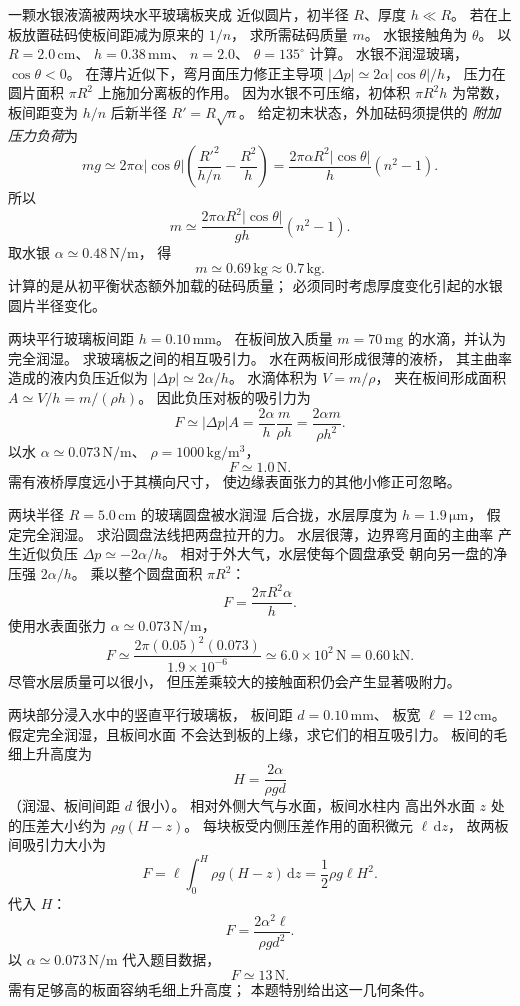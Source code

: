 一颗水银液滴被两块水平玻璃板夹成
近似圆片，初半径 $R$、厚度 $h\ll R$。
若在上板放置砝码使板间距减为原来的 $1/n$，
求所需砝码质量 $m$。
水银接触角为 $\theta$。
以 $R=2.0\,\mathrm{cm}$、
$h=0.38\,\mathrm{mm}$、
$n=2.0$、
$\theta=135^\circ$ 计算。
\exsolution
水银不润湿玻璃，
$\cos\theta<0$。
在薄片近似下，弯月面压力修正主导项
$|\Delta p|\simeq2\alpha|\cos\theta|/h$，
压力在圆片面积 $\pi R^2$ 上施加分离板的作用。
因为水银不可压缩，初体积
$\pi R^2h$ 为常数，
板间距变为 $h/n$ 后新半径
$R'=R\sqrt n$。
给定初末状态，外加砝码须提供的
\emph{附加压力负荷}为
\[
mg\simeq 2\pi\alpha|\cos\theta|
\left(\frac{R'^2}{h/n}-\frac{R^2}{h}\right)
=\frac{2\pi\alpha R^2|\cos\theta|}{h}(n^2-1).
\]
所以
\[
\boxed{m\simeq
\frac{2\pi\alpha R^2|\cos\theta|}{gh}(n^2-1)}.
\]
取水银 $\alpha\simeq0.48\,\mathrm{N/m}$，
得
\[
\boxed{m\simeq0.69\,\mathrm{kg}\approx0.7\,\mathrm{kg}}.
\]
\excheck 计算的是从初平衡状态额外加载的砝码质量；
必须同时考虑厚度变化引起的水银圆片半径变化。

两块平行玻璃板间距
$h=0.10\,\mathrm{mm}$。
在板间放入质量 $m=70\,\mathrm{mg}$
的水滴，并认为完全润湿。
求玻璃板之间的相互吸引力。
\exsolution
水在两板间形成很薄的液桥，
其主曲率造成的液内负压近似为
$|\Delta p|\simeq2\alpha/h$。
水滴体积为 $V=m/\rho$，
夹在板间形成面积
$A\simeq V/h=m/(\rho h)$。
因此负压对板的吸引力为
\[
F\simeq|\Delta p|A
=\frac{2\alpha}{h}\frac{m}{\rho h}
=\boxed{\frac{2\alpha m}{\rho h^2}}.
\]
以水 $\alpha\simeq0.073\,\mathrm{N/m}$、
$\rho=1000\,\mathrm{kg/m^3}$，
\[
\boxed{F\simeq1.0\,\mathrm N}.
\]
\excheck 需有液桥厚度远小于其横向尺寸，
使边缘表面张力的其他小修正可忽略。

两块半径
$R=5.0\,\mathrm{cm}$ 的玻璃圆盘被水润湿
后合拢，水层厚度为
$h=1.9\,\mathrm{\mu m}$，
假定完全润湿。
求沿圆盘法线把两盘拉开的力。
\exsolution
水层很薄，边界弯月面的主曲率
产生近似负压
$\Delta p\simeq-2\alpha/h$。
相对于外大气，水层使每个圆盘承受
朝向另一盘的净压强 $2\alpha/h$。
乘以整个圆盘面积 $\pi R^2$：
\[
\boxed{F=\frac{2\pi R^2\alpha}{h}}.
\]
使用水表面张力
$\alpha\simeq0.073\,\mathrm{N/m}$，
\[
\boxed{F\simeq
\frac{2\pi(0.05)^2(0.073)}{1.9\times10^{-6}}
\simeq6.0\times10^2\,\mathrm N=0.60\,\mathrm{kN}}.
\]
\excheck 尽管水层质量可以很小，
但压差乘较大的接触面积仍会产生显著吸附力。

两块部分浸入水中的竖直平行玻璃板，
板间距
$d=0.10\,\mathrm{mm}$、
板宽 $\ell=12\,\mathrm{cm}$。
假定完全润湿，且板间水面
不会达到板的上缘，求它们的相互吸引力。
\exsolution
板间的毛细上升高度为
\[
H=\frac{2\alpha}{\rho gd}
\]
（润湿、板间间距 $d$ 很小）。
相对外侧大气与水面，板间水柱内
高出外水面 $z$ 处的压差大小约为
$\rho g(H-z)$。
每块板受内侧压差作用的面积微元
$\ell\,\mathrm dz$，
故两板间吸引力大小为
\[
F=\ell\int_0^H\rho g(H-z)\,\mathrm dz
=\frac12\rho g\ell H^2.
\]
代入 $H$：
\[
\boxed{F=\frac{2\alpha^2\ell}{\rho gd^2}}.
\]
以 $\alpha\simeq0.073\,\mathrm{N/m}$
代入题目数据，
\[
\boxed{F\simeq13\,\mathrm N}.
\]
\excheck 需有足够高的板面容纳毛细上升高度；
本题特别给出这一几何条件。


